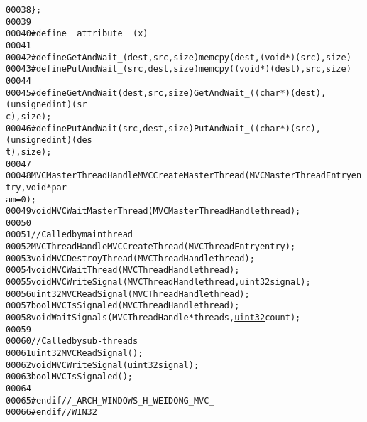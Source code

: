 \begin{footnotesize}
\begin{alltt}
00038 \};
00039 
00040 \textcolor{preprocessor}{#define \_\_attribute\_\_(x)  }
00041 \textcolor{preprocessor}{}
00042 \textcolor{preprocessor}{#define GetAndWait\_(dest, src, size) memcpy(dest, (void*)(src), size)}
00043 \textcolor{preprocessor}{}\textcolor{preprocessor}{#define PutAndWait\_(src, dest, size) memcpy((void*)(dest), src, size)}
00044 \textcolor{preprocessor}{}
00045 \textcolor{preprocessor}{#define GetAndWait(dest, src, size) GetAndWait\_((char *)(dest), (unsigned int)(sr
      c), size);}
00046 \textcolor{preprocessor}{}\textcolor{preprocessor}{#define PutAndWait(src, dest, size) PutAndWait\_((char *)(src), (unsigned int)(des
      t), size);}
00047 \textcolor{preprocessor}{}
00048 MVCMasterThreadHandle MVCCreateMasterThread(MVCMasterThreadEntry entry, \textcolor{keywordtype}{void} *par
      am = 0);
00049 \textcolor{keywordtype}{void} MVCWaitMasterThread(MVCMasterThreadHandle thread);
00050 
00051 \textcolor{comment}{// Called by main thread}
00052 MVCThreadHandle MVCCreateThread(MVCThreadEntry entry);
00053 \textcolor{keywordtype}{void} MVCDestroyThread(MVCThreadHandle thread);
00054 \textcolor{keywordtype}{void} MVCWaitThread(MVCThreadHandle thread);
00055 \textcolor{keywordtype}{void} MVCWriteSignal(MVCThreadHandle thread, \hyperlink{_types_8h_a1134b580f8da4de94ca6b1de4d37975e}{uint32} signal);
00056 \hyperlink{_types_8h_a1134b580f8da4de94ca6b1de4d37975e}{uint32} MVCReadSignal(MVCThreadHandle thread);
00057 \textcolor{keywordtype}{bool} MVCIsSignaled(MVCThreadHandle thread);
00058 \textcolor{keywordtype}{void} WaitSignals(MVCThreadHandle *threads, \hyperlink{_types_8h_a1134b580f8da4de94ca6b1de4d37975e}{uint32} count);
00059 
00060 \textcolor{comment}{// Called by sub-threads}
00061 \hyperlink{_types_8h_a1134b580f8da4de94ca6b1de4d37975e}{uint32} MVCReadSignal();
00062 \textcolor{keywordtype}{void} MVCWriteSignal(\hyperlink{_types_8h_a1134b580f8da4de94ca6b1de4d37975e}{uint32} signal);
00063 \textcolor{keywordtype}{bool} MVCIsSignaled();
00064 
00065 \textcolor{preprocessor}{#endif //\_ARCH\_WINDOWS\_H\_WEIDONG\_MVC\_}
00066 \textcolor{preprocessor}{}\textcolor{preprocessor}{#endif // WIN32}
\end{alltt}\end{footnotesize}
